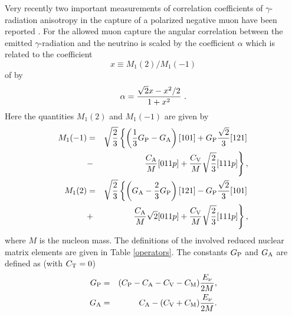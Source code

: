 \begin{multicols}{2}
Very recently two important measurements of correlation coefficients of
$\gamma$-radiation anisotropy in the capture of a polarized negative muon
have been reported \cite{MOF97,bru}. For the allowed muon capture the
angular correlation between the emitted $\gamma$-radiation and the neutrino
is scaled by the coefficient $\alpha$ \cite{PAR78,MOF97} which is related
to the coefficient
        \begin{equation}
       x\equiv M_1(2)/M_1(-1)
       \label{xdef}
        \end{equation}
of \cite{bru} by
        \begin{equation}
          \alpha = {\sqrt{2}x - x^2/2 \over 1+x^2}\ .
          \label{alphax}
        \end{equation}
Here the quantities $M_1(2)$ and $M_1(-1)$ are given by
        \begin{eqnarray}
        M_1(-1)&=&\sqrt{2\over3}\left\{\left({1\over3}G_{\rm P}-G_{\rm A}
                \right)[101]+G_{\rm P}{\sqrt2\over3}[121]\right.\cr
                &-& \left.{C_{\rm A}
                \over M}[011p]+{C_{\rm V}\over M}\sqrt{2\over3}[111p]\right\},\\
        M_1(2)&=&\sqrt{2\over3}\left\{\left(G_{\rm A}-{2\over3}G_{\rm P}\right)
                [121]-G_{\rm P}{\sqrt2\over3}[101]\right.\cr &+&
                \left.{C_{\rm A}\over M}\sqrt2
                [011p]+{C_{\rm V}\over M}\sqrt{2\over3}[111p]\right\},
        \end{eqnarray}
where $M$ is the nucleon mass. The definitions of the involved reduced nuclear
matrix elements are given in Table \ref{operators}. The constants $G_{\rm P}$
and $G_{\rm A}$ are defined as (with $C_{\rm T}=0$)
        \begin{eqnarray}
        G_{\rm P}&=&(C_{\rm P}-C_{\rm A}-C_{\rm V}-C_{\rm M}){E_\nu\over2M},\\
        G_{\rm A}&=&C_{\rm A}-(C_{\rm V}+C_{\rm M}){E_\nu\over2M}.
        \end{eqnarray}


\end{multicols}
